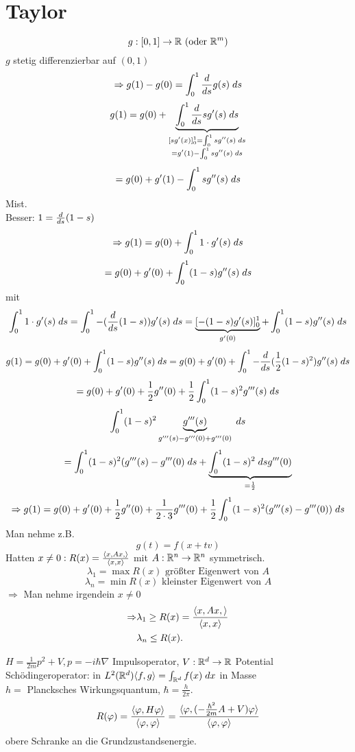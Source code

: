 \documentclass[../ana2.tex]{subfiles}
\begin{document}
\setcounter{section}{14}
\section{Taylor}
\[ \abb{g}{[0,1]}{\R} \text{ (oder \(\R^m\))} \]
\( g \) stetig differenzierbar auf \( (0,1) \) 
\[ \Rightarrow g(1) - g(0) = \integralx{\ddx{s} g(s)}{0}{1}{s} \]
\[ g(1) = g(0) + \underbrace{\integralx{\ddx{s}s g'(s)}{0}{1}{s}}
_{\substack{[sg'(x)]_0^1 = \integralx{sg''(s)}{0}{1}{s} \\
= g'(1) - \integralx{sg''(s)}{0}{1}{s}}} \]
\[ = g(0) + g'(1) - \integralx{sg''(s)}{0}{1}{s} \]
Mist.\\
Besser: \( 1 = \ddx{s} (1 - s) \)
\[ \Rightarrow g(1) = g(0) + \integralx{1 \cdot g'(s)}{0}{1}{s} \]
\[ = g(0) + g'(0) + \integralx{(1-s)g''(s)}{0}{1}{s} \]
mit
\[ \integralx{1 \cdot g'(s)}{0}{1}{s}
= \integralx{-(\ddx{s} (1-s))g'(s)}{0}{1}{s} = \underbrace{[-(1-s)g'(s)]_0^1}_{g'(0)}
+ \integralx{(1-s)g''(s)}{0}{1}{s} \]
\[ g(1) = g(0) + g'(0) + \integralx{(1-s)g''(s)}{0}{1}{s} 
= g(0) + g'(0) + \integralx{-\ddx{s} (\frac{1}{2} (1-s)^2) g''(s)}{0}{1}{s} \]
\[ = g(0) + g'(0) + \frac{1}{2}g''(0) 
+ \frac{1}{2}\integralx{(1-s)^2 g'''(s)}{0}{1}{s} \]
\[ \integralx{(1-s)^2 \underbrace{g'''(s)}_{g'''(s) - g'''(0) + g'''(0)}}{0}{1}{s} \]
\[ = \integralx{(1-s)^2(g'''(s) - g'''(0)}{0}{1}{s} 
+ \underbrace{\integralx{(1-s)^2}{0}{1}{s} g'''(0) }_{=\frac{1}{2}} \]
\[ \Rightarrow g(1) = g(0) 
+ g'(0) + \frac{1}{2}g''(0) 
+ \frac{1}{2\cdot 3} g'''(0) 
+ \frac{1}{2} \integralx{(1-s)^2(g'''(s) - g'''(0))}{0}{1}{s} \]
Man nehme z.B.
\[ g(t) = f(x+tv) \]
Hatten \(x \neq 0: R(x) = \frac{\scalarprod{x, Ax}}{\scalarprod{x}{x}}\)
mit \(\abb{A}{\R^n}{\R^n}\) symmetrisch.
\[ \lambda_1 = \max R(x) \text{ größter Eigenwert von } A \]
\[ \lambda_n = \min R(x) \text{ kleinster Eigenwert von } A \]
\(\Rightarrow\) Man nehme irgendein \(x \neq 0\)
\begin{align*}
    \Rightarrow &\lambda_1 \geq R(x) = \frac{\scalarprod{x, Ax}}{\scalarprod{x}{x}}\\
    &\lambda_n \leq R(x).
\end{align*}
\begin{bsp}
    \( H = \frac{1}{2m} p^2 + V, p = -i \hbar\nabla \) Impulsoperator, 
    \( \abb{V}{\R^d}{\R} \) Potential \\
    Schödingeroperator: in \(L^2(\R^d) \scalarprod{f}{g} 
    = \integral{f(x)}{\R^d}{} \) in Masse \\
    \(h = \) Plancksches Wirkungsquantum, \( \hbar = \frac{h}{2\pi} \).\\
    \[ R(\varphi) = \frac{\scalarprod{\varphi}{H\varphi}}{\scalarprod{\varphi}{\varphi}} 
    = \frac{\scalarprod{\varphi}{(-\frac{\hbar^2}{2m} A + V)\varphi}}{\scalarprod{\varphi}{\varphi}} \]
    obere Schranke an die Grundzustandsenergie.
\end{bsp}
\end{document}
